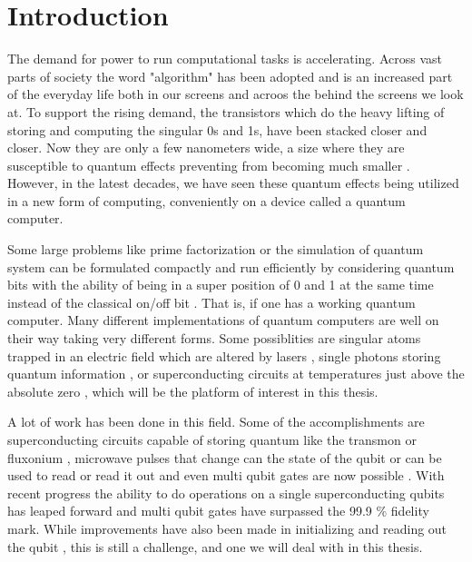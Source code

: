 \chapter{Introduction}\label{chap:Introduction}
The demand for power to run computational tasks is accelerating. Across vast parts of society the word "algorithm" has been adopted and is an increased part of the everyday life both in our screens and acroos the behind the screens we look at. To support the rising demand, the transistors which do the heavy lifting of storing and computing the singular 0s and 1s, have been stacked closer and closer. Now they are only a few nanometers wide, a size where they are susceptible to quantum effects preventing from becoming much smaller \cite{morton_embracing_2011}. However, in the latest decades, we have seen these quantum effects being utilized in a new form of computing, conveniently on a device called a quantum computer. 

Some large problems like prime factorization or the simulation of quantum system can be formulated compactly and run efficiently by considering quantum bits with the ability of being in a super position of 0 and 1 at the same time instead of the classical on/off bit \cite{preskill_quantum_2018}. That is, if one has a working quantum computer. Many different implementations of quantum computers are well on their way taking very different forms. Some possiblities are singular atoms trapped in an electric field which are altered by lasers \cite{brown_co-designing_2016}, single photons storing quantum information \cite{obrien_optical_2007}, or superconducting circuits at temperatures just above the absolute zero \cite{krantz_quantum_2019}, which will be the platform of interest in this thesis. 

A lot of work has been done in this field. Some of the accomplishments are superconducting circuits capable of storing quantum like the transmon \cite{koch_charge_2007} or fluxonium \cite{manucharyan_fluxonium_2009}, microwave pulses that change can the state of the qubit or can be used to read or read it out\cite{motzoi_simple_2009} and even multi qubit gates are now possible \cite{yan_tunable_2018}. With recent progress the ability to do operations on a single superconducting qubits \cite{barends_superconducting_2014} has leaped forward and multi qubit gates have surpassed the 99.9 \% fidelity mark\cite{ding_high-fidelity_2023}. While improvements have also been made in initializing and reading out the qubit \cite{walter_rapid_2017, swiadek_enhancing_2023}, this is still a challenge, and one we will deal with in this thesis.


